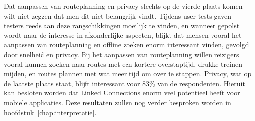 Dat aanpassen van routeplanning en privacy slechts op de vierde plaats komen wilt niet zeggen dat men dit niet belangrijk vindt. Tijdens user-tests gaven testers reeds aan deze rangschikkingen moeilijk te vinden, en wanneer gepolst wordt naar de interesse in afzonderlijke aspecten, blijkt dat mensen vooral het aanpassen van routeplanning en offline zoeken enorm interessant vinden, gevolgd door snelheid en privacy. Bij het aanpassen van routeplanning willen reizigers vooral kunnen zoeken naar routes met een kortere overstaptijd, drukke treinen mijden, en routes plannen met wat meer tijd om over te stappen. Privacy, wat op de laatste plaats staat, blijft interessant voor 83\% van de respondenten. Hieruit kan besloten worden dat Linked Connections enorm veel potentieel heeft voor mobiele applicaties. Deze resultaten zullen nog verder besproken worden in hoofdstuk~\ref{chap:interpretatie}.

